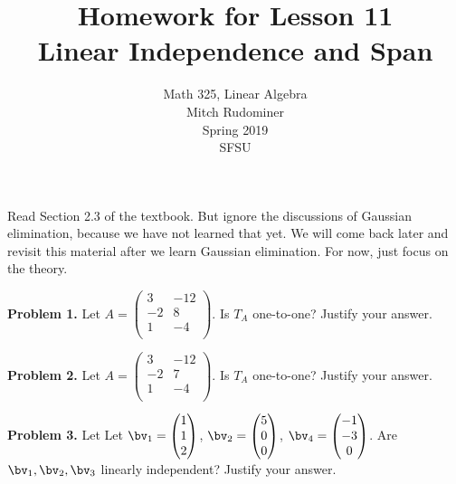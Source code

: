 \documentclass[oneside,12pt]{amsart}
\begin{document}
\title{Homework for Lesson 11 \\ Linear Independence and Span}
\author{Math 325, Linear Algebra \\ Mitch Rudominer \\ Spring 2019 \\ SFSU }
\date{}

\maketitle

Read Section 2.3 of the textbook. But ignore the discussions of
Gaussian elimination, because we have not learned that yet. We will come
back later and revisit this material after we learn Gaussian elimination.
For now, just focus on the theory.

\bigskip


\textbf{Problem 1.} Let
$
A =
\begin{pmatrix}
3  & -12 \\
-2 &  8  \\
1  & -4  \\
\end{pmatrix}
$.
Is $T_A$ one-to-one? Justify your answer.

\bigskip
\bigskip
\bigskip
\bigskip
\bigskip
\bigskip
\bigskip
\bigskip
\bigskip
\bigskip

\textbf{Problem 2.} Let
$
A =
\begin{pmatrix}
3  & -12 \\
-2 &  7  \\
1  & -4  \\
\end{pmatrix}
$.
Is $T_A$ one-to-one? Justify your answer.

\bigskip
\bigskip
\bigskip
\bigskip
\bigskip
\bigskip
\bigskip
\bigskip
\bigskip
\bigskip

\textbf{Problem 3.} Let
Let $\bv_1 =
\begin{pmatrix}
1 \\
1 \\
2 \\
\end{pmatrix}
$,
$\bv_2 =
\begin{pmatrix}
5 \\
0 \\
0 \\
\end{pmatrix}
$,
$\bv_4 =
\begin{pmatrix}
-1 \\
-3 \\
0 \\
\end{pmatrix}
$.
Are $\bv_1,\bv_2,\bv_3$ linearly independent? Justify your answer.
\end{document}
